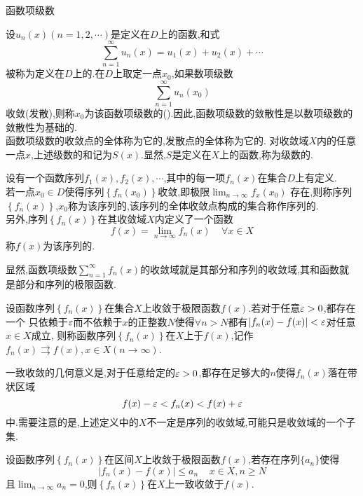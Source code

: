 \documentclass{ctexart}
\begin{document}
\pagestyle{empty}
\begin{center}\large 函数项级数\end{center}
\begin{definition}[函数项级数]
   设$u_n(x)(n=1,2,\cdots)$是定义在$D$上的函数,和式
   \[\sum_{n=1}^{\infty}u_n(x)=u_1(x)+u_2(x)+\cdots\]
   被称为定义在$D$上的.在$D$上取定一点$x_0$,如果数项级数
   \[\sum_{n=1}^{\infty}u_n\left(x_0\right)\]
   收敛(发散),则称$x_0$为该函数项级数的().因此,函数项级数的敛散性是以数项级数的敛散性为基础的.\\
   函数项级数的收敛点的全体称为它的,发散点的全体称为它的.%
   对收敛域$X$内的任意一点$x$,上述级数的和记为$S(x)$.显然,$S$是定义在$X$上的函数,称为级数的.
\end{definition}
\noindent{}
\begin{definition}[2.1 函数序列的收敛性和极限函数]
    设有一个函数序列$f_1(x),f_2(x),\cdots$,其中的每一项$f_n(x)$在集合$D$上有定义.\\
    若一点$x_0\in D$使得序列$\left\{f_n\left(x_0\right)\right\}$收敛,即极限$\displaystyle\lim_{n\to\infty}f_x\left(x_0\right)$%
    存在,则称序列$\left\{f_n(x)\right\}$,$x_0$称为该序列的,该序列的全体收敛点构成的集合称作序列的.\\
    另外,序列$\left\{f_n(x)\right\}$在其收敛域$X$内定义了一个函数
    \[f(x)=\lim_{n\to\infty}f_n(x)\ \ \ \ \ \forall x\in X\]
    称$f(x)$为该序列的.
\end{definition}\noindent
显然,函数项级数$\displaystyle\sum_{n=1}^{\infty}f_n(x)$的收敛域就是其部分和序列的收敛域,其和函数就是部分和序列的极限函数.
\begin{definition}[2.2 一致收敛]
    设函数序列$\left\{f_n(x)\right\}$在集合$X$上收敛于极限函数$f(x)$.若对于任意$\varepsilon>0$,都存在一个%
    只依赖于$\varepsilon$而不依赖于$x$的正整数$N$使得$\forall n>N$都有$\left|f_n(x)-f(x)\right|<\varepsilon$对任意$x\in X$成立,%
    则称函数序列$\left\{f_n(x)\right\}$在$X$上于$f(x)$,记作$f_n(x)\rightrightarrows f(x),x\in X(n\to\infty)$.
\end{definition}\noindent
一致收敛的几何意义是,对于任意给定的$\varepsilon>0$,都存在足够大的$n$使得$f_n(x)$落在带状区域
\[f(x)-\varepsilon<f_n(x)<f(x)+\varepsilon\]
中.需要注意的是,上述定义中的$X$不一定是序列的收敛域,可能只是收敛域的一个子集.
\begin{formal}[2.3 一致收敛的判据I]
    设函数序列$\left\{f_n(x)\right\}$在区间$X$上收敛于极限函数$f(x)$,若存在序列$\{a_n\}$使得
    \[\left|f_n(x)-f(x)\right|\leqslant a_n\ \ \ \ \ x\in X,n\geqslant N\]
    且$\displaystyle\lim_{n\to\infty}a_n=0$,则$\left\{f_n(x)\right\}$在$X$上一致收敛于$f(x)$.
\end{formal}
\end{document}
